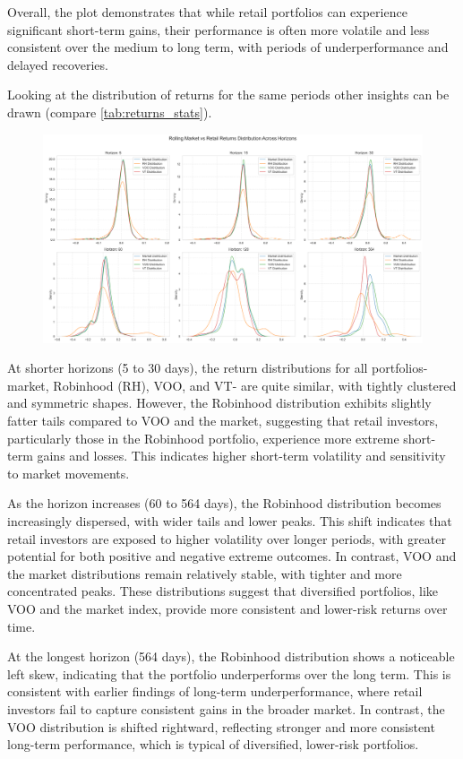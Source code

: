 Overall, the plot demonstrates that while retail portfolios can experience significant short-term gains, their performance is often more volatile and less consistent over the medium to long term, with periods of underperformance and delayed recoveries.

Looking at the distribution of returns for the same periods other insights can be drawn (compare \ref{tab:returns_stats}). 

\begin{figure}[h!]
    \centering
    \includegraphics[width=1\linewidth]{../images/distributions_comparison.png}
\end{figure}

At shorter horizons (5 to 30 days), the return distributions for all portfolios- market, Robinhood (RH), VOO, and VT- are quite similar, with tightly clustered and symmetric shapes. However, the Robinhood distribution exhibits slightly fatter tails compared to VOO and the market, suggesting that retail investors, particularly those in the Robinhood portfolio, experience more extreme short-term gains and losses. This indicates higher short-term volatility and sensitivity to market movements.

As the horizon increases (60 to 564 days), the Robinhood distribution becomes increasingly dispersed, with wider tails and lower peaks. This shift indicates that retail investors are exposed to higher volatility over longer periods, with greater potential for both positive and negative extreme outcomes. In contrast, VOO and the market distributions remain relatively stable, with tighter and more concentrated peaks. These distributions suggest that diversified portfolios, like VOO and the market index, provide more consistent and lower-risk returns over time.

At the longest horizon (564 days), the Robinhood distribution shows a noticeable left skew, indicating that the portfolio underperforms over the long term. This is consistent with earlier findings of long-term underperformance, where retail investors fail to capture consistent gains in the broader market. In contrast, the VOO distribution is shifted rightward, reflecting stronger and more consistent long-term performance, which is typical of diversified, lower-risk portfolios.

